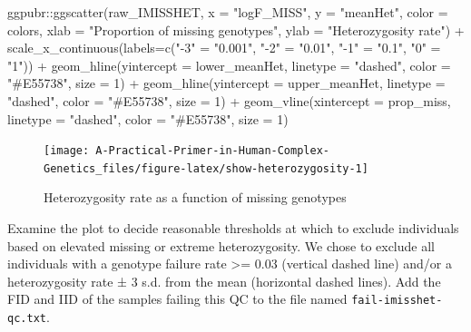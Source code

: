 \documentclass[
]{book}
\newenvironment{Shaded}{\begin{snugshade}}{\end{snugshade}}
\newcommand{\AttributeTok}[1]{\textcolor[rgb]{0.77,0.63,0.00}{#1}}
\newcommand{\DecValTok}[1]{\textcolor[rgb]{0.00,0.00,0.81}{#1}}
\newcommand{\FunctionTok}[1]{\textcolor[rgb]{0.00,0.00,0.00}{#1}}
\newcommand{\NormalTok}[1]{#1}
\newcommand{\OtherTok}[1]{\textcolor[rgb]{0.56,0.35,0.01}{#1}}
\newcommand{\SpecialCharTok}[1]{\textcolor[rgb]{0.00,0.00,0.00}{#1}}
\newcommand{\StringTok}[1]{\textcolor[rgb]{0.31,0.60,0.02}{#1}}
\begin{document}
\begin{Shaded}
\begin{Highlighting}[]
\NormalTok{ggpubr}\SpecialCharTok{::}\FunctionTok{ggscatter}\NormalTok{(raw\_IMISSHET, }\AttributeTok{x =} \StringTok{"logF\_MISS"}\NormalTok{, }\AttributeTok{y =} \StringTok{"meanHet"}\NormalTok{,}
                  \AttributeTok{color =}\NormalTok{ colors,}
                  \AttributeTok{xlab =} \StringTok{"Proportion of missing genotypes"}\NormalTok{, }\AttributeTok{ylab =} \StringTok{"Heterozygosity rate"}\NormalTok{) }\SpecialCharTok{+}
  \FunctionTok{scale\_x\_continuous}\NormalTok{(}\AttributeTok{labels=}\FunctionTok{c}\NormalTok{(}\StringTok{"{-}3"} \OtherTok{=} \StringTok{"0.001"}\NormalTok{, }\StringTok{"{-}2"} \OtherTok{=} \StringTok{"0.01"}\NormalTok{,}
                              \StringTok{"{-}1"} \OtherTok{=} \StringTok{"0.1"}\NormalTok{, }\StringTok{"0"} \OtherTok{=} \StringTok{"1"}\NormalTok{)) }\SpecialCharTok{+}
  \FunctionTok{geom\_hline}\NormalTok{(}\AttributeTok{yintercept =}\NormalTok{ lower\_meanHet, }\AttributeTok{linetype =} \StringTok{"dashed"}\NormalTok{,}
                \AttributeTok{color =} \StringTok{"\#E55738"}\NormalTok{, }\AttributeTok{size =} \DecValTok{1}\NormalTok{) }\SpecialCharTok{+}
  \FunctionTok{geom\_hline}\NormalTok{(}\AttributeTok{yintercept =}\NormalTok{ upper\_meanHet, }\AttributeTok{linetype =} \StringTok{"dashed"}\NormalTok{,}
                \AttributeTok{color =} \StringTok{"\#E55738"}\NormalTok{, }\AttributeTok{size =} \DecValTok{1}\NormalTok{) }\SpecialCharTok{+}
  \FunctionTok{geom\_vline}\NormalTok{(}\AttributeTok{xintercept =}\NormalTok{ prop\_miss, }\AttributeTok{linetype =} \StringTok{"dashed"}\NormalTok{,}
                \AttributeTok{color =} \StringTok{"\#E55738"}\NormalTok{, }\AttributeTok{size =} \DecValTok{1}\NormalTok{)}
\end{Highlighting}
\end{Shaded}

\begin{figure}

{\centering \texttt{[image: A-Practical-Primer-in-Human-Complex-Genetics\_files/figure-latex/show-heterozygosity-1]} 

}

\caption{Heterozygosity rate as a function of missing genotypes}\label{fig:show-heterozygosity}
\end{figure}

Examine the plot to decide reasonable thresholds at which to exclude individuals based on elevated missing or extreme heterozygosity. We chose to exclude all individuals with a genotype failure rate \textgreater= 0.03 (vertical dashed line) and/or a heterozygosity rate ± 3 s.d. from the mean (horizontal dashed lines). Add the FID and IID of the samples failing this QC to the file named \texttt{fail-imisshet-qc.txt}.
\end{document}
